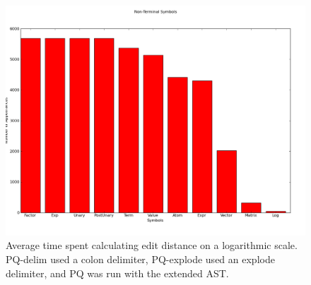 \begin{figure}
    \begin{center}
        \includegraphics[scale=0.4]{figs/gen/nonterm_histogram.png}
    \end{center}
        \caption{Average time spent calculating edit distance on a
                logarithmic scale. PQ-delim used a colon delimiter, PQ-explode
                used an explode delimiter, and PQ was run with the extended
                AST.}
    \label{times}
\end{figure}








